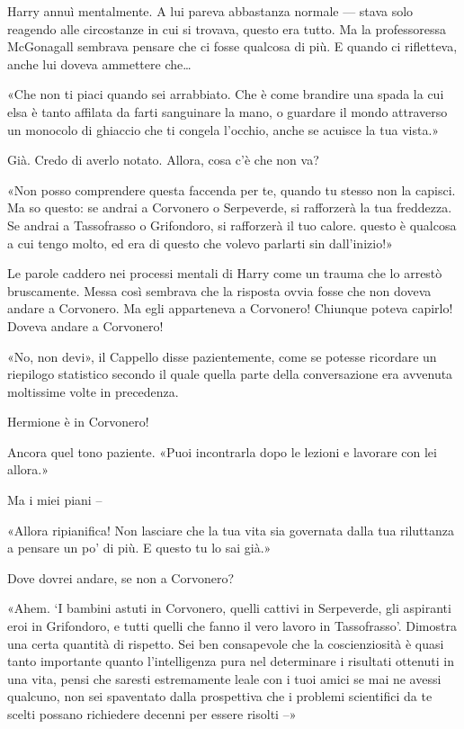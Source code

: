 Harry annuì mentalmente. A lui pareva abbastanza normale — stava solo reagendo alle circostanze in cui si trovava, questo era tutto. Ma la professoressa McGonagall sembrava pensare che ci fosse qualcosa di più. E quando ci rifletteva, anche lui doveva ammettere che…

«Che non ti piaci quando sei arrabbiato. Che è come brandire una spada la cui elsa è tanto affilata da farti sanguinare la mano, o guardare il mondo attraverso un monocolo di ghiaccio che ti congela l’occhio, anche se acuisce la tua vista.»

Già. Credo di averlo notato. Allora, cosa c’è che non va?

«Non posso comprendere questa faccenda per te, quando tu stesso non la capisci. Ma so questo: se andrai a Corvonero o Serpeverde, si rafforzerà la tua freddezza. Se andrai a Tassofrasso o Grifondoro, si rafforzerà il tuo calore. questo è qualcosa a cui tengo molto, ed era di questo che volevo parlarti sin dall’inizio!»

Le parole caddero nei processi mentali di Harry come un trauma che lo arrestò bruscamente. Messa così sembrava che la risposta ovvia fosse che non doveva andare a Corvonero. Ma egli apparteneva a Corvonero! Chiunque poteva capirlo! Doveva andare a Corvonero!

«No, non devi», il Cappello disse pazientemente, come se potesse ricordare un riepilogo statistico secondo il quale quella parte della conversazione era avvenuta moltissime volte in precedenza.

Hermione è in Corvonero!

Ancora quel tono paziente. «Puoi incontrarla dopo le lezioni e lavorare con lei allora.»

Ma i miei piani –

«Allora ripianifica! Non lasciare che la tua vita sia governata dalla tua riluttanza a pensare un po’ di più. E questo tu lo sai già.»

Dove dovrei andare, se non a Corvonero?

«Ahem. ‘I bambini astuti in Corvonero, quelli cattivi in Serpeverde, gli aspiranti eroi in Grifondoro, e tutti quelli che fanno il vero lavoro in Tassofrasso’. Dimostra una certa quantità di rispetto. Sei ben consapevole che la coscienziosità è quasi tanto importante quanto l’intelligenza pura nel determinare i risultati ottenuti in una vita, pensi che saresti estremamente leale con i tuoi amici se mai ne avessi qualcuno, non sei spaventato dalla prospettiva che i problemi scientifici da te scelti possano richiedere decenni per essere risolti –»

